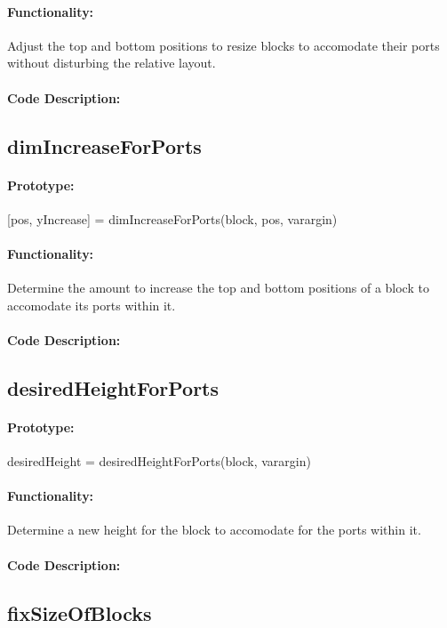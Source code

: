 \documentclass[12pt,letterpaper]{report}
\begin{document}
\paragraph{Functionality:} Adjust the top and bottom positions to resize blocks to accomodate their ports without disturbing the relative layout.
\paragraph{Code Description:}

\subsection{dimIncreaseForPorts}
\paragraph{Prototype:} [pos, yIncrease] = dimIncreaseForPorts(block, pos, varargin)
\paragraph{Functionality:} Determine the amount to increase the top and bottom positions of a block to accomodate its ports within it.
\paragraph{Code Description:}

\subsection{desiredHeightForPorts}
\paragraph{Prototype:} desiredHeight = desiredHeightForPorts(block, varargin)
\paragraph{Functionality:} Determine a new height for the block to accomodate for the ports within it.
\paragraph{Code Description:}

\subsection{fixSizeOfBlocks}
\end{document}
